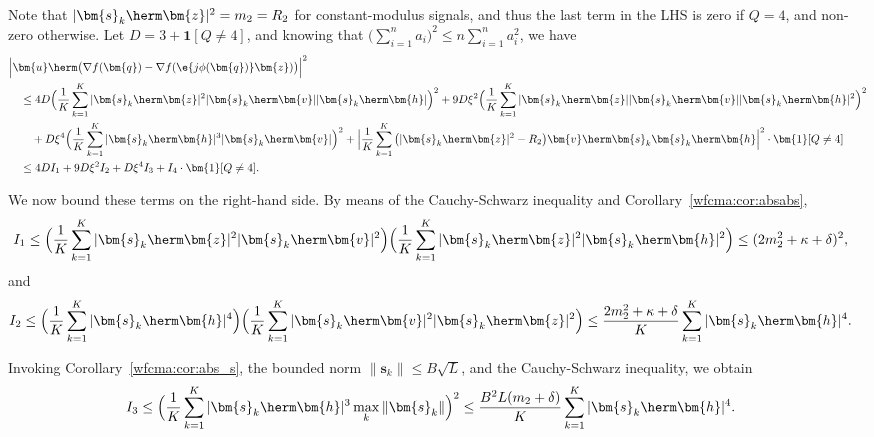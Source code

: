 Note that $|\bm{s}_k\herm\bm{z}|^2=m_2=R_2$ for constant-modulus signals, and thus the last term in the LHS is zero if $Q=4$, and non-zero otherwise. Let $D=3+\bm{1}[Q\neq4]$, and knowing that $\big(\sum_{i=1}^n a_i\big)^2\leq n\sum_{i=1}^n a_i^2$, we have
\begin{align}
	&\Big|\bm{u}\herm\big(\nabla f(\bm{q})-\nabla f(\e{j\phi(\bm{q})}\bm{z})\big)\Big|^2\nonumber\\
 	&\quad
	\leq 4D\Big(\frac{1}{K}\sum_{k=1}^K|\bm{s}_k\herm\bm{z}|^2|\bm{s}_k\herm\bm{v}||\bm{s}_k\herm\bm{h}|\Big)^2  
	+9D\xi^2\Big(\frac{1}{K}\sum_{k=1}^K|\bm{s}_k\herm\bm{z}||\bm{s}_k\herm\bm{v}||\bm{s}_k\herm\bm{h}|^2\Big)^2
	\nonumber\\&\qquad
	+D\xi^4\Big(\frac{1}{K}\sum_{k=1}^K|\bm{s}_k\herm\bm{h}|^3|\bm{s}_k\herm\bm{v}|\Big)^2
	+\Big|\frac{1}{K}\sum_{k=1}^K\big(|\bm{s}_k\herm\bm{z}|^2-R_2\big)\bm{v}\herm\bm{s}_k\bm{s}_k\herm\bm{h}\Big|^2\cdot\bm{1}[Q\neq4]\nonumber\\
	&\quad\leq 4DI_1+9D\xi^2I_2+D\xi^4I_3+I_4\cdot\bm{1}[Q\neq4].\nonumber
\end{align}

We now bound these terms on the right-hand side. By means of the Cauchy-Schwarz inequality and Corollary~\ref{wfcma:cor:absabs},
\begin{align}
	I_1&\leq\Big(\frac{1}{K}\sum_{k=1}^K|\bm{s}_k\herm\bm{z}|^2|\bm{s}_k\herm\bm{v}|^2\Big)\Big(\frac{1}{K}\sum_{k=1}^K|\bm{s}_k\herm\bm{z}|^2|\bm{s}_k\herm\bm{h}|^2\Big)
	\leq(2  m_2^2+\kappa+\delta)^2,\nonumber
\end{align}
and
\begin{align}
	I_2&\leq\Big(\frac{1}{K}\sum_{k=1}^K|\bm{s}_k\herm\bm{h}|^4\Big)\Big(\frac{1}{K}\sum_{k=1}^K|\bm{s}_k\herm\bm{v}|^2|\bm{s}_k\herm\bm{z}|^2\Big)
	\leq\frac{2  m_2^2+\kappa+\delta}{K}\sum_{k=1}^K|\bm{s}_k\herm\bm{h}|^4.\nonumber
\end{align}

Invoking Corollary~\ref{wfcma:cor:abs_s}, the bounded norm $\|\bm{s}_k\|\leq B\sqrt{L}$, and the Cauchy-Schwarz inequality, we obtain
\begin{align}
	I_3&\leq\Big(\frac{1}{K}\sum_{k=1}^K|\bm{s}_k\herm\bm{h}|^3\max_{k}\|\bm{s}_k\|\Big)^2
	\leq\frac{B^2L(  m_2+\delta)}{K}\sum_{k=1}^K|\bm{s}_k\herm\bm{h}|^4.\nonumber
\end{align}

